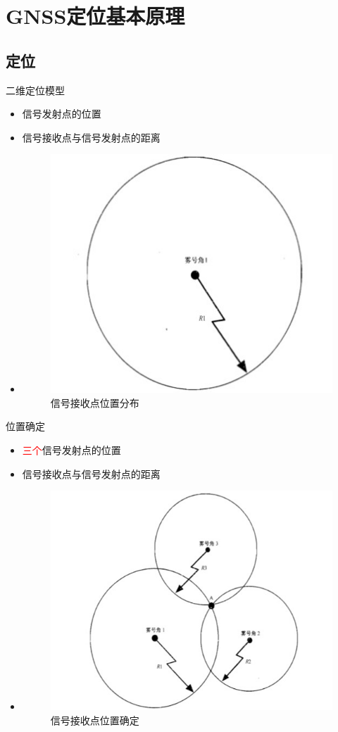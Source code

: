\section{GNSS定位基本原理}
\subsection{定位}
\begin{frame}{二维定位模型}
    \begin{itemize}
        \item 信号发射点的位置
        \item 信号接收点与信号发射点的距离
        \item[]
        \begin{figure}
            \centering
            \includegraphics[width=.5\textwidth]{pic/signal_distance.jpg}
            \caption{信号接收点位置分布}
            \label{fig:sig_distance}
        \end{figure}
    \end{itemize}
\end{frame}

\begin{frame}{位置确定}
    \begin{itemize}
        \item \textcolor{red}{三个}信号发射点的位置
        \item 信号接收点与信号发射点的距离
        \item[]
        \begin{figure}
            \centering
            \includegraphics[width=.5\textwidth]{pic/signal_distance_3.jpg}
            \caption{信号接收点位置确定}
            \label{fig:sig_distance_3}
        \end{figure}
    \end{itemize}
\end{frame}

